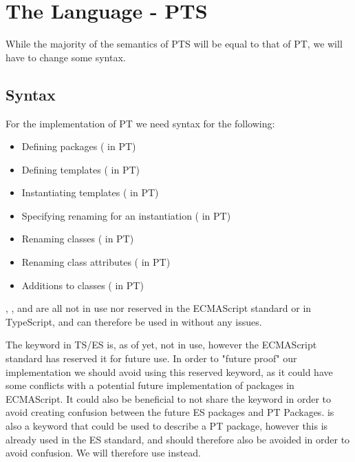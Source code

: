 \chapter{The Language - PTS}\label{ch:the-language---pts}

While the majority of the semantics of PTS will be equal to that of PT, we will have to change some syntax.

\section{Syntax}\label{sec:syntax}

For the implementation of PT we need syntax for the following:

\begin{itemize}
    \item Defining packages ( in PT)
    \item Defining templates ( in PT)
    \item Instantiating templates ( in PT)
    \item Specifying renaming for an instantiation ( in PT)
    \item Renaming classes (\codeword{=>} in PT)
    \item Renaming class attributes (\codeword{->} in PT)
    \item Additions to classes ( in PT)
\end{itemize}

, , and  are all not in use nor reserved in the ECMAScript standard or in TypeScript, and can therefore be used in \plname{} without any issues.

The keyword  in TS/ES is, as of yet, not in use, however the ECMAScript standard has reserved it for future use.
In order to "future proof" our implementation we should avoid using this reserved keyword, as it could have some conflicts with a potential future implementation of packages in ECMAScript.
It could also be beneficial to not share the keyword in order to avoid creating confusion between the future ES packages and PT Packages.
 is also a keyword that could be used to describe a PT package, however this is already used in the ES standard, and should therefore also be avoided in order to avoid confusion.
We will therefore use  instead.

